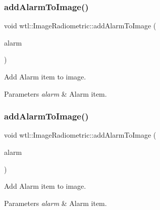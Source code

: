 \subsubsection{\texorpdfstring{add\+Alarm\+To\+Image()}{addAlarmToImage()}\hspace{0.1cm}{\footnotesize\ttfamily [1/2]}}
{\footnotesize\ttfamily void wtl\+::\+Image\+Radiometric\+::add\+Alarm\+To\+Image (\begin{DoxyParamCaption}\item[{std\+::shared\+\_\+ptr$<$ \hyperlink{structwtl_1_1_alarm_struct}{Alarm\+Struct} $>$}]{alarm }\end{DoxyParamCaption})}



Add Alarm item to image. 


\begin{DoxyParams}{Parameters}
{\em alarm} & Alarm item. \\
\hline
\end{DoxyParams}
\mbox{\label{classwtl_1_1_image_radiometric_a3e7eb6b8c50f85dc43cc1e2f372cdd3f}} 
\subsubsection{\texorpdfstring{add\+Alarm\+To\+Image()}{addAlarmToImage()}\hspace{0.1cm}{\footnotesize\ttfamily [2/2]}}
{\footnotesize\ttfamily void wtl\+::\+Image\+Radiometric\+::add\+Alarm\+To\+Image (\begin{DoxyParamCaption}\item[{const \hyperlink{structwtl_1_1_alarm_struct}{Alarm\+Struct} \&}]{alarm }\end{DoxyParamCaption})}



Add Alarm item to image. 


\begin{DoxyParams}{Parameters}
{\em alarm} & Alarm item. \\
\hline
\end{DoxyParams}
\mbox{\label{classwtl_1_1_image_radiometric_ac430cfe342329fd5077a33abf1eefd71}} 
